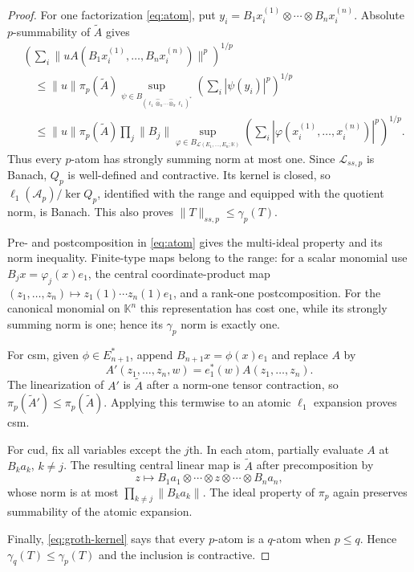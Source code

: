 \documentclass[11pt]{amsart}
\newcommand{\K}{\mathbb K}
\newcommand{\Lcal}{\mathcal L}
\newcommand{\wh}{\widehat\otimes_{\pi}}
\begin{document}
\begin{proof}
For one factorization \eqref{eq:atom}, put
$y_i=B_1x_i^{(1)}\otimes\cdots\otimes B_nx_i^{(n)}$.  Absolute
$p$-summability of $\widetilde A$ gives
\begin{align*}
 &\left(\sum_i\|uA(B_1x_i^{(1)},\ldots,B_nx_i^{(n)})\|^p\right)^{1/p}\\
 &\quad\leq
 \|u\|\pi_p(\widetilde A)
 \sup_{\psi\in B_{(\ell_1\wh\cdots\wh\ell_1)^*}}
 \left(\sum_i|\psi(y_i)|^p\right)^{1/p}\\
 &\quad\leq
 \|u\|\pi_p(\widetilde A)\prod_j\|B_j\|
 \sup_{\varphi\in B_{\Lcal(E_1,\ldots,E_n;\K)}}
 \left(\sum_i|\varphi(x_i^{(1)},\ldots,x_i^{(n)})|^p\right)^{1/p}.
\end{align*}
Thus every $p$-atom has strongly summing norm at most one.  Since
$\Lcal_{ss,p}$ is Banach, $Q_p$ is well-defined and contractive.  Its kernel
is closed, so
$\ell_1(\mathcal A_p)/\ker Q_p$, identified with the range and equipped with
the quotient norm, is Banach.  This also proves
$\|T\|_{ss,p}\leq\gamma_p(T)$.

Pre- and postcomposition in \eqref{eq:atom} gives the multi-ideal property and
its norm inequality.  Finite-type maps belong to the range: for a scalar
monomial use $B_jx=\varphi_j(x)e_1$, the central coordinate-product map
$(z_1,\ldots,z_n)\mapsto z_1(1)\cdots z_n(1)e_1$, and a rank-one
postcomposition.  For the canonical monomial on $\K^n$ this representation
has cost one, while its strongly summing norm is one; hence its $\gamma_p$
norm is exactly one.

For csm, given $\phi\in E_{n+1}^*$, append
$B_{n+1}x=\phi(x)e_1$ and replace $A$ by
\[
 A'(z_1,\ldots,z_n,w)=e_1^*(w)A(z_1,\ldots,z_n).
\]
The linearization of $A'$ is $\widetilde A$ after a norm-one tensor
contraction, so $\pi_p(\widetilde A')\leq\pi_p(\widetilde A)$.  Applying this
termwise to an atomic $\ell_1$ expansion proves csm.

For cud, fix all variables except the $j$th.  In each atom, partially evaluate
$A$ at $B_k a_k$, $k\ne j$.  The resulting central linear map is
$\widetilde A$ after precomposition by
\[
 z\longmapsto
 B_1a_1\otimes\cdots\otimes z\otimes\cdots\otimes B_na_n,
\]
whose norm is at most $\prod_{k\ne j}\|B_ka_k\|$.  The ideal property of
$\pi_p$ again preserves summability of the atomic expansion.

Finally, \eqref{eq:groth-kernel} says that every $p$-atom is a $q$-atom when
$p\leq q$.  Hence $\gamma_q(T)\leq\gamma_p(T)$ and the inclusion is
contractive.
\end{proof}
\end{document}
